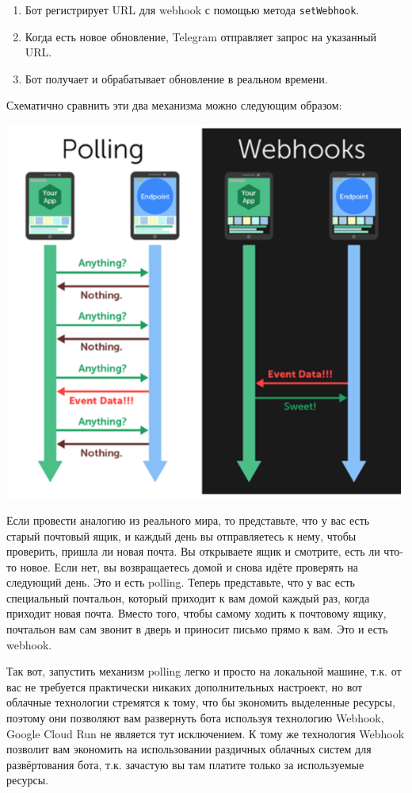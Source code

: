 \documentclass[
]{book}
\providecommand{\tightlist}{%
  \setlength{\itemsep}{0pt}\setlength{\parskip}{0pt}}
\begin{document}
\begin{enumerate}
\def\labelenumi{\arabic{enumi}.}
\tightlist
\item
  Бот регистрирует URL для webhook с помощью метода \texttt{setWebhook}.
\item
  Когда есть новое обновление, Telegram отправляет запрос на указанный URL.
\item
  Бот получает и обрабатывает обновление в реальном времени.
\end{enumerate}

Схематично сравнить эти два механизма можно следующим образом:

\includegraphics{img/10-pooling-webhook-infographics.png}

Если провести аналогию из реального мира, то представьте, что у вас есть старый почтовый ящик, и каждый день вы отправляетесь к нему, чтобы проверить, пришла ли новая почта. Вы открываете ящик и смотрите, есть ли что-то новое. Если нет, вы возвращаетесь домой и снова идёте проверять на следующий день. Это и есть polling. Теперь представьте, что у вас есть специальный почтальон, который приходит к вам домой каждый раз, когда приходит новая почта. Вместо того, чтобы самому ходить к почтовому ящику, почтальон вам сам звонит в дверь и приносит письмо прямо к вам. Это и есть webhook.

Так вот, запустить механизм polling легко и просто на локальной машине, т.к. от вас не требуется практически никаких дополнительных настроект, но вот облачные технологии стремятся к тому, что бы экономить выделенные ресурсы, поэтому они позволяют вам развернуть бота используя технологию Webhook, Google Cloud Run не является тут исключением. К тому же технология Webhook позволит вам экономить на использовании раздичных облачных систем для развёртования бота, т.к. зачастую вы там платите только за используемые ресурсы.
\end{document}
